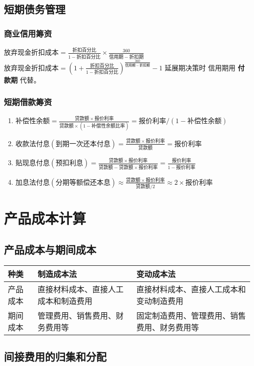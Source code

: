 \documentclass[11pt]{article}
\begin{document}
\subsection{短期债务管理}
\label{sec:org2a71963}
\subsubsection{商业信用筹资}
\label{sec:org5cca158}
\(放弃现金折扣成本=\frac{折扣百分比}{1-折扣百分比}\times\frac{360}{信用期-折扣期}\)
\(放弃现金折扣成本=(1+\frac{折扣百分比}{1-折扣百分比})^{\frac{360}{信用期-折扣期}}-1\)
延展期决策时 信用期用 \textbf{付款期} 代替。
\subsubsection{短期借款筹资}
\label{sec:orgb84c618}
\begin{enumerate}
\item \(补偿性余额 = \frac{贷款额\times 报价利率}{贷款额\times (1-补偿性余额比率)}=报价利率/(1-补偿性余额)\)
\item \(收款法付息(到期一次还本付息)=\frac{贷款额\times 报价利率}{贷款额}=报价利率\)
\item \(贴现息付息(预扣利息)=\frac{贷款额\times 报价利率}{贷款额-贷款额\times 报价利率}=\frac{报价利率}{1-报价利率}\)
\item \(加息法付息(分期等额偿还本息)\approx\frac{贷款额\times 报价利率}{贷款额/2}\approx2\times 报价利率\)
\end{enumerate}
\section{产品成本计算}
\label{sec:org027c1fd}
\subsection{产品成本与期间成本}
\label{sec:org272af61}
\begin{center}
\begin{tabular}{lll}
种类 & 制造成本法 & 变动成本法\\
\hline
产品成本 & 直接材料成本、直接人工成本和制造费用 & 直接材料成本、直接人工成本和变动制造费用\\
期间成本 & 管理费用、销售费用、财务费用等 & 固定制造费用、管理费用、销售费用、财务费用等\\
\end{tabular}
\end{center}
\subsection{间接费用的归集和分配}
\label{sec:org700e098}
\end{document}

